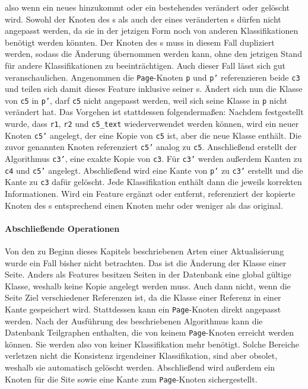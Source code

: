 \begin{enumerate}
        also wenn ein neues hinzukommt oder ein bestehendes verändert oder gelöscht wird.
        Sowohl der Knoten des {\parentFeature}s als auch der eines veränderten {\childFeature}s
        dürfen nicht angepasst werden, da sie in der jetzigen Form noch von anderen
        Klassifikationen benötigt werden könnten.
        Der Knoten des {\parentFeature}s muss in diesem Fall dupliziert werden,
        sodass die Änderung übernommen werden kann,
        ohne den jetzigen Stand für andere Klassifikationen zu beeinträchtigen.
        Auch dieser Fall lässt sich gut veranschaulichen.
        Angenommen die \texttt{Page}-Knoten \texttt{p} und \texttt{p'} referenzieren beide \texttt{c3} und teilen sich damit
        dieses Feature inklusive seiner {\childFeature}s.
        Ändert sich nun die Klasse von \texttt{c5} in \texttt{p'},
        darf \texttt{c5} nicht angepasst werden, weil sich seine Klasse in \texttt{p} nicht verändert hat.
        Das Vorgehen ist stattdessen folgendermaßen:
        Nachdem festgestellt wurde, dass \texttt{r1}, \texttt{r2} und \texttt{c5\_text} wiederverwendet werden können,
        wird ein neuer Knoten \texttt{c5'} angelegt, der eine Kopie von \texttt{c5} ist, aber die neue Klasse enthält.
        Die zuvor genannten Knoten referenziert \texttt{c5'} analog zu \texttt{c5}.
        Anschließend erstellt der Algorithmus \texttt{c3'}, eine exakte Kopie von \texttt{c3}.
        Für \texttt{c3'} werden außerdem Kanten zu \texttt{c4} und \texttt{c5'} angelegt.
        Abschließend wird eine Kante von \texttt{p'} zu \texttt{c3'} erstellt und die Kante zu \texttt{c3} dafür gelöscht.
        Jede Klassifikation enthält dann die jeweils korrekten Informationen.
        Wird ein Feature ergänzt oder entfernt, referenziert der kopierte Knoten des {\parentFeature}s
        entsprechend einen Knoten mehr oder weniger als das original.
    \end{enumerate}

    \paragraph{Abschließende Operationen}
    Von den zu Beginn dieses Kapitels beschriebenen Arten einer Aktualisierung wurde ein Fall bisher nicht betrachten.
    Das ist die Änderung der Klasse einer Seite.
    Anders als Features besitzen Seiten in der Datenbank eine global gültige Klasse,
    weshalb keine Kopie angelegt werden muss.
    Auch dann nicht, wenn die Seite Ziel verschiedener Referenzen ist,
    da die Klasse einer Referenz in einer Kante gespeichert wird.
    Stattdessen kann ein \texttt{Page}-Knoten direkt angepasst werden.
    Nach der Ausführung des beschriebenen Algorithmus kann die Datenbank
    Teilgraphen enthalten, die von keinem \texttt{Page}-Knoten erreicht werden können.
    Sie werden also von keiner Klassifikation mehr benötigt.
    Solche Bereiche verletzen nicht die Konsistenz irgendeiner Klassifikation,
    sind aber obsolet, weshalb sie automatisch gelöscht werden.
    Abschließend wird außerdem ein Knoten für die Site sowie eine Kante zum \texttt{Page}-Knoten sichergestellt.


